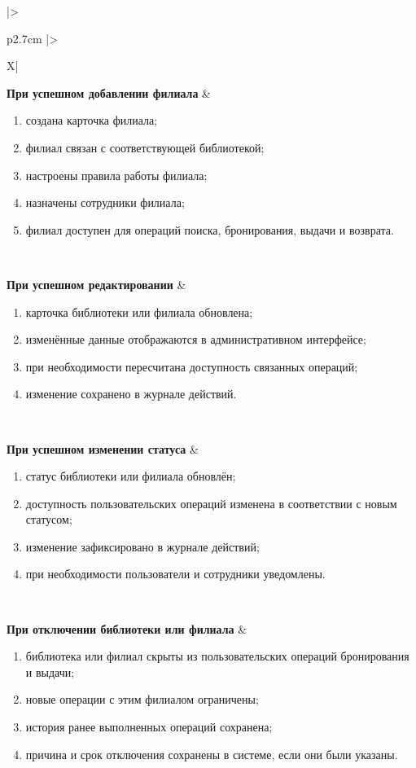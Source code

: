 \documentclass[12pt,a4paper]{article}
\begin{document}
\begin{xltabular}{\textwidth}{
				|>{\raggedright\arraybackslash}p{2.7cm}
				|>{\raggedright\arraybackslash}X|
			}
			\textbf{При успешном добавлении филиала} &
			\begin{enumerate}
				\item создана карточка филиала;
				\item филиал связан с соответствующей библиотекой;
				\item настроены правила работы филиала;
				\item назначены сотрудники филиала;
				\item филиал доступен для операций поиска, бронирования, выдачи и
				возврата.
			\end{enumerate} \\
			\hline
			
			\textbf{При успешном редактировании} &
			\begin{enumerate}
				\item карточка библиотеки или филиала обновлена;
				\item изменённые данные отображаются в административном интерфейсе;
				\item при необходимости пересчитана доступность связанных операций;
				\item изменение сохранено в журнале действий.
			\end{enumerate} \\
			\hline
			
			\textbf{При успешном изменении статуса} &
			\begin{enumerate}
				\item статус библиотеки или филиала обновлён;
				\item доступность пользовательских операций изменена в соответствии
				с новым статусом;
				\item изменение зафиксировано в журнале действий;
				\item при необходимости пользователи и сотрудники уведомлены.
			\end{enumerate} \\
			\hline
			
			\textbf{При отключении библиотеки или филиала} &
			\begin{enumerate}
				\item библиотека или филиал скрыты из пользовательских операций
				бронирования и выдачи;
				\item новые операции с этим филиалом ограничены;
				\item история ранее выполненных операций сохранена;
				\item причина и срок отключения сохранены в системе, если они были
				указаны.
			\end{enumerate} \\
			\hline
			

\end{xltabular}
\end{document}
